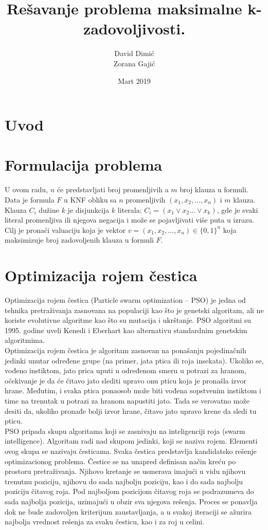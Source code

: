 \documentclass{article}
\title{Rešavanje problema maksimalne k-zadovoljivosti.}
\author{David Dimić\\ Zorana Gajić}
\date{Mart 2019}
\begin{document}
\maketitle  
\newpage
\tableofcontents
\newpage

\section{Uvod}
\section{Formulacija problema}
U ovom radu, $n$  će predstavljati broj promenljivih a $m$ broj klauza u formuli. Data je formula $F$ u KNF obliku sa $n$ promenljivih $(x_1, x_2, ..., x_n)$ i $m$ klauza. \\ 

Klauza $C_i$ dužine $k$ je disjunkcija $k$ literala: 
$C_i = (x_1  \vee x_2 ... \vee x_k)$, gde je svaki literal promenljiva ili njegova negacija i može se pojavljivati više puta u izrazu.
Cilj je pronaći valuaciju koja je vektor $v = (x_1, x_2, ..., x_n) \in \{ 0,1 \}^n$ koja maksimizuje broj zadovoljenih klauza u formuli $F$.


\section{Optimizacija rojem čestica}
Optimizacija rojem čestica (Particle swarm optimization – PSO) je jedna od tehnika pretraživanja zasnovana na populaciji kao što je genetski algoritam, ali ne koriste evolutivne algoritme kao što su mutacija i ukrštanje.
PSO algoritmi su 1995. godine uveli Kenedi i Eberhart kao alternativu standardnim genetskim algoritmima. \\

Optimizacija rojem čestica je algoritam zasnovan na ponašanju pojedinačnih jedinki unutar određene grupe (na primer, jata ptica ili roja insekata). Ukoliko se, vođeno instiktom, jato prica uputi u određenom smeru u potrazi za hranom, očekivanje je da će čitavo jato slediti upravo onu pticu koja je pronašla izvor hrane. Međutim, i svaka ptica ponaosob može biti vođena sopstvenim instiktom i time na trenutak u potrazi za hranom napustiti jato. Tada se verovatno može desiti da, ukoliko pronađe bolji izvor hrane, čitavo jato upravo krene da sledi tu pticu. \\

PSO pripada skupu algoritama koji se zasnivaju na inteligenciji roja (swarm intelligence). Algoritam radi nad skupom jedinki, koji se naziva rojem. Elementi ovog skupa se nazivaju česticama. 
Svaka čestica predstavlja kandidatsko rešenje optimizacionog problema. Čestice se na unapred definisan način kreću po prostoru pretraživanja. Njihovo kretanje se usmerava imajući u vidu njihovu trenutnu poziciju, njihovu do sada najbolju poziciju, kao i do sada najbolju poziciju čitavog roja. Pod najboljom pozicijom čitavog roja se podrazumeva do sada najbolja pozicija, uzimajući u obzir sva njegova rešenja. Proces se ponavlja dok ne bude zadovoljen kriterijum zaustavljanja, a u svakoj iteraciji se ažurira najbolja vrednost rešenja za svaku česticu, kao i za roj u celini. \\
\end{document}

